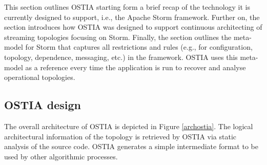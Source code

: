 

This section outlines OSTIA starting form a brief recap of the technology it is currently designed to support, i.e., the Apache Storm framework. Further on, the section introduces how OSTIA was designed to support continuous architecting of streaming topologies focusing on Storm. Finally, the section outlines the meta-model for Storm that captures all restrictions and rules (e.g., for configuration, topology, dependence, messaging, etc.) in the framework. OSTIA uses this meta-model as a reference every time the application is run to recover and analyse operational topologies.

\subsection{OSTIA design}

The overall architecture of OSTIA is depicted in
Figure \ref{archostia}. The logical architectural information of the
topology is retrieved by OSTIA via static analysis of the source code. OSTIA
generates a simple intermediate format to be used by other algorithmic
processes.

